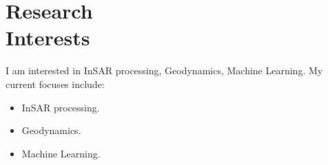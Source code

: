 \documentclass{mycv}
\begin{document}
\maketitle%

\section{Research \\ Interests}

I am interested in InSAR processing, Geodynamics, Machine Learning. My current focuses include:

\begin{itemize}
  \item InSAR processing.
  \item Geodynamics.
  \item Machine Learning.
\end{itemize}
\end{document}
